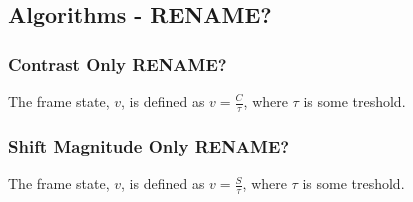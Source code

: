 \subsection{Algorithms - RENAME?}\label{sec:algorithms}
%
\subsubsection{Contrast Only RENAME?}
%
The frame state, $v$, is defined as $v=\frac{C}{\tau}$, %
%
where $\tau$ is some treshold.
%
\subsubsection{Shift Magnitude Only RENAME?}
%
The frame state, $v$, is defined as $v=\frac{S}{\tau}$, %
%
where $\tau$ is some treshold.
%
